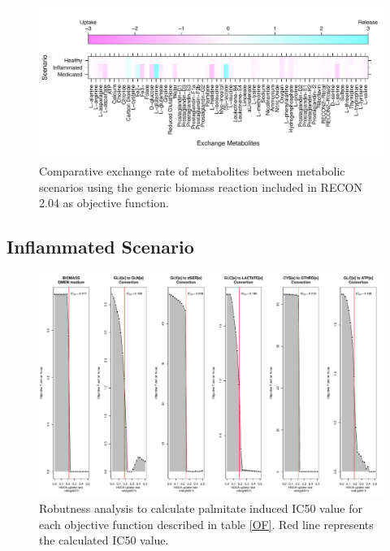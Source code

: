 \begin{figure}[h]
\begin{center}
\includegraphics[width=\textwidth]{neuroprotective/Exchanges}
\end{center}
\caption{Comparative exchange rate of metabolites between metabolic scenarios using the generic biomass reaction included in RECON 2.04 as objective function.}
\label{Exchanges}
\end{figure}

\subsection*{Inflammated Scenario}
\begin{figure}[h]
\begin{center}
\includegraphics[width=\textwidth]{neuroprotective/IC50}
\end{center}
\caption{Robutness analysis to calculate palmitate induced IC50 value for each objective function described in table \ref{OF}. Red line represents the calculated IC50 value.}
\end{figure}

